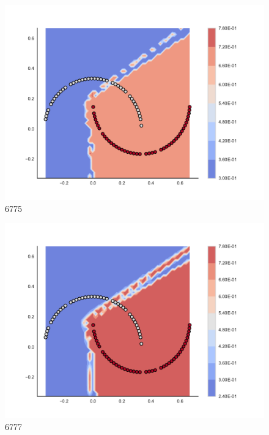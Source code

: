 \begin{subfigure}[b]{0.09\textwidth}
    \includegraphics[clip, trim=2.35cm 1.75cm 4.5cm 0cm,width=\textwidth]{img/convergence/6775.pdf}
    \caption{6775}
    \label{fig:convergence_6775}
\end{subfigure}
%
\begin{subfigure}[b]{0.09\textwidth}
    \includegraphics[clip, trim=2.35cm 1.75cm 4.5cm 0cm,width=\textwidth]{img/convergence/6777.pdf}
    \caption{6777}
    \label{fig:convergence_6777}
\end{subfigure}
%
